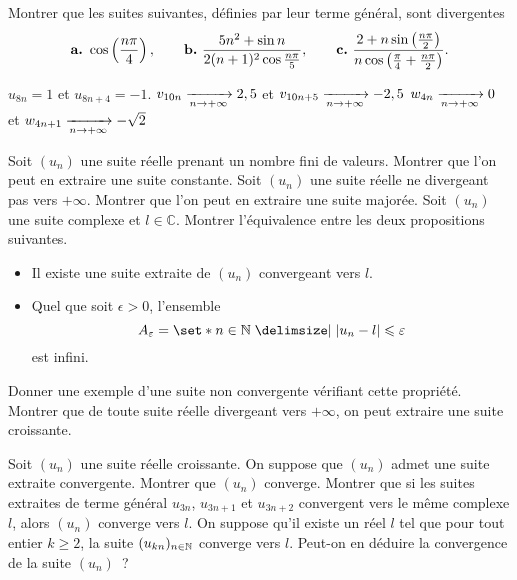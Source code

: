 \documentclass{magnolia}
\begin{document}

Montrer que les suites suivantes, définies par leur terme général, sont
divergentes
\[\textbf{a.}\ \cos\p{\frac{n\pi}{4}}, \qquad \textbf{b.}\ \frac{5n^2+\sin n}{2(n+1)^2 \cos\frac{n\pi}{5}},
  \qquad
  \textbf{c.}\ \frac{2+n\sin\p{\frac{n\pi}{2}}}{n\cos\p{\frac{\pi}{4}+\frac{n\pi}{2}}}.\]
  
  \begin{sol}
  \begin{questions}
  \question $u_{8n}=1$ et $u_{8n+4}=-1$.
  \question $v_{10n}\xrightarrow[n\rightarrow +\infty]{}2,5$ et $v_{10n+5}\xrightarrow[n\rightarrow +\infty]{}-2,5$
  \question $w_{4n}\xrightarrow[n\rightarrow +\infty]{}0$ et $w_{4n+1}\xrightarrow[n\rightarrow +\infty]{}-\sqrt{2}$
  \end{questions}
  \end{sol}


  \begin{questions}
  \question Soit $(u_n)$ une suite réelle prenant un nombre fini de valeurs.
    Montrer que l'on peut en extraire une suite constante.
  \question Soit $(u_n)$ une suite réelle ne divergeant pas vers $+\infty$.
    Montrer que l'on peut en extraire une suite majorée.
  \question Soit $(u_n)$ une suite complexe et $l\in \mathbb{C}$. Montrer
    l'équivalence entre les deux propositions suivantes.
  \begin{itemize}
  \item Il existe une suite extraite de $(u_n)$ convergeant vers $l$.
  \item Quel que soit $\epsilon > 0$, l'ensemble
    \[A_\epsilon=\enstq{n \in \N}{|u_n-l|\leq \epsilon}\]
    est infini.
  \end{itemize}
  Donner une exemple d'une suite non convergente vérifiant cette propriété.
\question Montrer que de toute suite réelle divergeant vers $+\infty$, on peut
  extraire une suite croissante.
\end{questions}

\begin{questions}
\question Soit $(u_n)$ une suite réelle croissante. On suppose que $(u_n)$ admet une
  suite extraite convergente. Montrer que $(u_n)$ converge.
\question Montrer que si les suites extraites de terme général $u_{3n}$,
  $u_{3n+1}$ et $u_{3n+2}$ convergent vers le même complexe $l$, alors $(u_n)$
  converge vers $l$.
\question On suppose qu'il existe un réel $l$ tel que pour tout entier
  $k\geq 2$, la suite $(u_{kn})_{n\in\mathbb{N}}$ converge vers $l$.
  Peut-on en déduire la convergence de la suite $(u_n)$~?
\end{questions}
\end{document}
